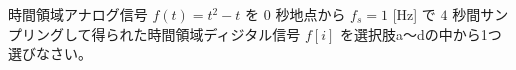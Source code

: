 時間領域アナログ信号 $f(t) = t^2-t$ を $0$ 秒地点から $f_s = 1$ [Hz] で $4$ 秒間サンプリングして得られた時間領域ディジタル信号 $f[i]$ を選択肢a〜dの中から1つ選びなさい。
